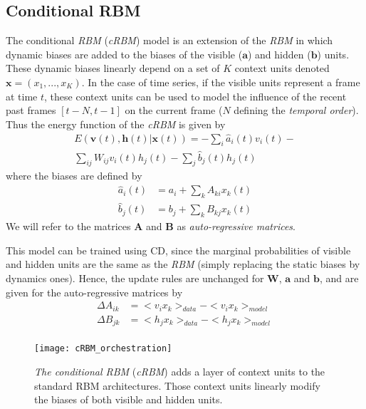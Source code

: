 \documentclass[letterpaper]{article}
\begin{document}
\subsection{Conditional RBM}
The conditional \textit{RBM} (\textit{cRBM}) model \cite{taylor2009factored} is an extension of the \textit{RBM} in which dynamic biases are added to the biases of the visible ($\bm{a}$) and hidden ($\bm{b}$) units. These dynamic biases linearly depend on a set of $K$ context units denoted $\bm{x} = (x_{1},...,x_{K})$. In the case of time series, if the visible units represent a frame at time $t$, these context units can be used to model the influence of the recent past frames $\left[ t-N, t-1 \right]$ on the current frame ($N$ defining the \textit{temporal order}).
Thus the energy function of the \textit{cRBM} is given by
\begin{equation}
\begin{split}
\label{eq:energy_cRBM}
E(\bm{v}(t),\bm{h}(t)|\bm{x}(t)) =  - \sum_{i} \hat{a}_{i}(t)v_{i}(t) - \\ \sum_{ij}W_{ij}v_{i}(t)h_{j}(t) - \sum_{j} \hat{b}_{j}(t)h_{j}(t)
\end{split}
\end{equation}
where the biases are defined by 
\begin{align*}
\hat{a}_{i}(t) &= a_{i} + \sum_{k}A_{ki}x_{k}(t)\\
\hat{b}_{j}(t) &= b_{j} + \sum_{k}B_{kj}x_{k}(t)
\end{align*}
We will refer to the matrices $\bm{A}$ and $\bm{B}$ as \textit{auto-regressive matrices}.

This model can be trained using CD, since the marginal probabilities of visible and hidden units are the same as the \textit{RBM} (simply replacing the static biases by dynamics ones).
Hence, the update rules are unchanged for $\bm{W}$, $\bm{a}$ and $\bm{b}$, and are given for the auto-regressive matrices by
\begin{align}
\Delta A_{ik} 	&=<v_{i}x_{k} >_{data} - <v_{i}x_{k} >_{model}\\
\Delta B_{jk} 	&= <h_{j}x_{k} >_{data} - <h_{j}x_{k} >_{model}\\
\end{align}

\begin{figure}
\centering
\texttt{[image: cRBM\_orchestration]}
\caption{\textit{The conditional RBM} (\textit{cRBM}) adds a layer of context units to the standard RBM architectures. Those context units linearly modify the biases of both visible and hidden units.}
\end{figure}
\end{document}
